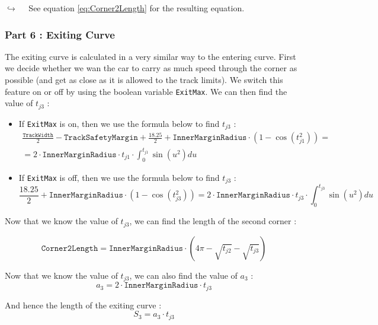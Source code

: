 \documentclass[a4paper, 11pt]{article}
\begin{document}
$\hookrightarrow\quad$ See equation \ref{eq:Corner2Length} for the resulting equation.

\subsubsection{Part 6 : Exiting Curve}

The exiting curve is calculated in a very similar way to the entering curve. First we decide whether we wan the car to carry as much speed through the corner as possible (and get as close as it is allowed to the track limits). We switch this feature on or off by using the boolean variable \texttt{ExitMax}. We can then find the value of $t_{j3}$ :
\begin{itemize}
	\item If \texttt{ExitMax} is on, then we use the formula below to find $t_{j3}$ :
		\begin{align}
			\frac{\texttt{TrackWidth}}{2} - \texttt{TrackSafetyMargin} + \frac{18.25}{2} + \texttt{InnerMarginRadius}\cdot\left(1 - \cos\left(t_{j1}^2 \right) \right) =\nonumber \\ = 2\cdot \texttt{InnerMarginRadius}\cdot t_{j1} \cdot \int_0^{t_{j1}} \sin\left(u^2 \right)du
		\end{align}
	\item If \texttt{ExitMax} is off, then we use the formula below to find $t_{j3}$ :
		\begin{equation}
			\frac{18.25}{2} + \texttt{InnerMarginRadius}\cdot\left(1 - \cos\left(t_{j3}^2 \right) \right) =  2\cdot \texttt{InnerMarginRadius}\cdot t_{j3} \cdot \int_0^{t_{j3}} \sin\left(u^2 \right)du
		\end{equation}
\end{itemize}

Now that we know the value of $t_{j3}$, we can find the length of the second corner :

\begin{equation}
	\texttt{Corner2Length} = \texttt{InnerMarginRadius}\cdot\left(4\pi - \sqrt{t_{j2}} - \sqrt{t_{j3}} \right)
	\label{eq:Corner2Length}
\end{equation}

Now that we know the value of $t_{j3}$, we can also find the value of $a_3$ :
\begin{equation}
	a_3 = 2 \cdot \texttt{InnerMarginRadius} \cdot t_{j3}
\end{equation}

And hence the length of the exiting curve :
\begin{equation}
	S_3 = a_3\cdot t_{j3}
\end{equation}
\end{document}
